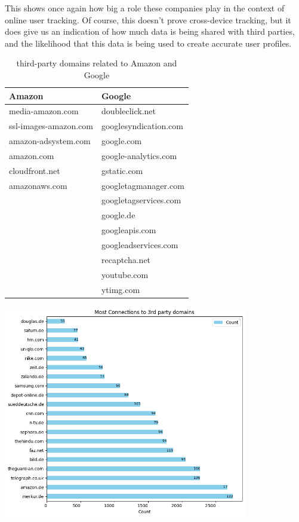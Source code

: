 This shows once again how big a role these companies play in the context of online user tracking. Of course, this doesn't prove cross-device tracking, but it does give us an indication of how much data is being shared with third parties, and the likelihood that this data is being used to create accurate user profiles.
\begin{table}[ht]
\small
\centering
\begin{tabularx}{0.6\textwidth}{|X|X|}
\hline
\textbf{Amazon} & \textbf{Google} \\
\hline
media-amazon.com & doubleclick.net \\
ssl-images-amazon.com & googlesyndication.com \\
amazon-adsystem.com & google.com \\
amazon.com & google-analytics.com \\
cloudfront.net & gstatic.com \\
amazonaws.com & googletagmanager.com \\
 & googletagservices.com \\
 & google.de \\
 & googleapis.com \\
 & googleadservices.com \\
 & recaptcha.net \\
 & youtube.com \\
 & ytimg.com \\
\hline
\end{tabularx}
\caption{third-party domains related to Amazon and Google}
\label{tab:third-party-domains}
\end{table}

\vspace{0.5cm}
\includegraphics[width=0.8\textwidth]{./assets/mostConnectionsToThirdPartyDomains.png}
\vspace{0.5cm}

